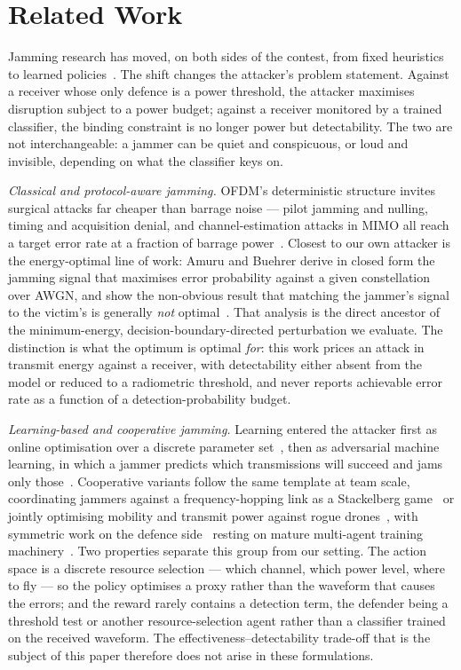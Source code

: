 \section{Related Work}
\label{sec:related}

Jamming research has moved, on both sides of the contest, from fixed heuristics to learned policies~\cite{pirayesh2022jamming,lohan2024survey}.
The shift changes the attacker's problem statement.
Against a receiver whose only defence is a power threshold, the attacker maximises disruption subject to a power budget; against a receiver monitored by a trained classifier, the binding constraint is no longer power but detectability.
The two are not interchangeable: a jammer can be quiet and conspicuous, or loud and invisible, depending on what the classifier keys on.

\textit{Classical and protocol-aware jamming.}
OFDM's deterministic structure invites surgical attacks far cheaper than barrage noise --- pilot jamming and nulling, timing and acquisition denial, and channel-estimation attacks in MIMO all reach a target error rate at a fraction of barrage power~\cite{shahriar2015phy,clancy2011efficient,lapan2012jamming,zhang2019jam}.
Closest to our own attacker is the energy-optimal line of work: Amuru and Buehrer derive in closed form the jamming signal that maximises error probability against a given constellation over AWGN, and show the non-obvious result that matching the jammer's signal to the victim's is generally \emph{not} optimal~\cite{amuru2015optimal}.
That analysis is the direct ancestor of the minimum-energy, decision-boundary-directed perturbation we evaluate.
The distinction is what the optimum is optimal \emph{for}: this work prices an attack in transmit energy against a receiver, with detectability either absent from the model or reduced to a radiometric threshold, and never reports achievable error rate as a function of a detection-probability budget.

\textit{Learning-based and cooperative jamming.}
Learning entered the attacker first as online optimisation over a discrete parameter set~\cite{amuru2016bandits}, then as adversarial machine learning, in which a jammer predicts which transmissions will succeed and jams only those~\cite{erpek2019deep}.
Cooperative variants follow the same template at team scale, coordinating jammers against a frequency-hopping link as a Stackelberg game~\cite{zhang2025cooperative} or jointly optimising mobility and transmit power against rogue drones~\cite{valianti2024cooperative}, with symmetric work on the defence side~\cite{xu2020convert,abolhassani2025coordinated,leuenberger2025proactive} resting on mature multi-agent training machinery~\cite{NIPS2017_68a97503,yu2022mappo}.
Two properties separate this group from our setting.
The action space is a discrete resource selection --- which channel, which power level, where to fly --- so the policy optimises a proxy rather than the waveform that causes the errors; and the reward rarely contains a detection term, the defender being a threshold test or another resource-selection agent rather than a classifier trained on the received waveform.
The effectiveness--detectability trade-off that is the subject of this paper therefore does not arise in these formulations.

